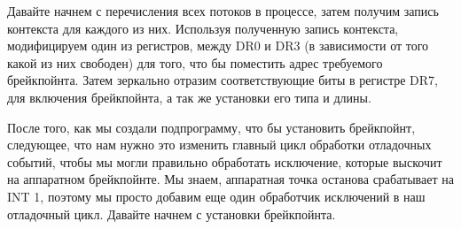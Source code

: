\documentclass[12pt, a4paper, oneside]{book}
\begin{document}
Давайте начнем с перечисления всех потоков в процессе, затем получим запись контекста для каждого из них. Используя полученную запись контекста, модифицируем один из регистров, между DR0 и DR3 (в зависимости от того какой из них свободен) для того, что бы поместить адрес требуемого брейкпойнта. Затем зеркально отразим соответствующие биты в регистре DR7, для включения брейкпойнта, а так же установки его типа и длины.

После того, как мы создали подпрограмму, что бы установить брейкпойнт, следующее, что нам нужно это изменить главный цикл обработки отладочных событий, чтобы мы могли правильно обработать исключение, которые выскочит на аппаратном брейкпойнте. Мы знаем, аппаратная точка останова срабатывает на INT 1, поэтому мы просто добавим еще один обработчик исключений в наш отладочный цикл. Давайте начнем с установки брейкпойнта.
\end{document}
